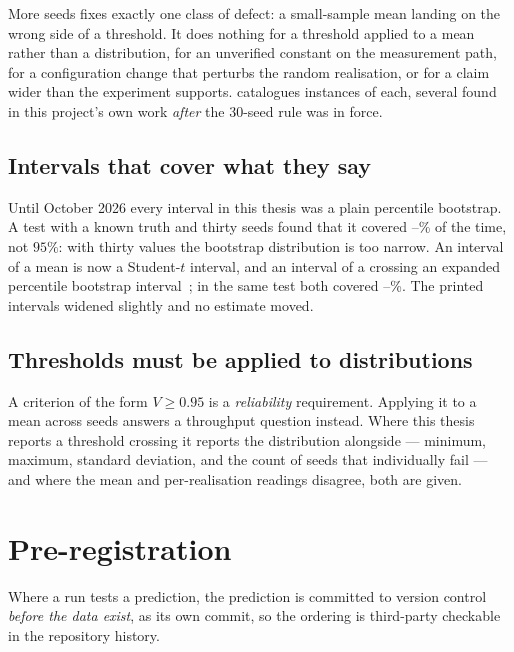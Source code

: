 \begin{remark}
More seeds fixes exactly one class of defect: a small-sample mean landing on the wrong side of a
threshold. It does nothing for a threshold applied to a mean rather than a distribution, for an
unverified constant on the measurement path, for a configuration change that perturbs the random
realisation, or for a claim wider than the experiment supports. 
catalogues instances of each, several found in this project's own work \emph{after} the 30-seed
rule was in force.
\end{remark}

\subsection{Intervals that cover what they say}\label{sec:coverage}

Until October 2026 every interval in this thesis was a plain percentile bootstrap. A test with a
known truth and thirty seeds found that it covered \covPlainLo--\covPlainHi\% of the time, not
$95\%$: with thirty values the bootstrap distribution is too narrow. An interval of a mean is now
a Student-$t$ interval, and an interval of a crossing an expanded percentile bootstrap
interval~\cite{hesterberg2015bootstrap}; in the same test both covered
\covFixedLo--\covFixedHi\%. The printed intervals widened slightly and no estimate moved.

\subsection{Thresholds must be applied to distributions}

A criterion of the form $V \geq 0.95$ is a \emph{reliability} requirement. Applying it to a mean
across seeds answers a throughput question instead. Where this thesis reports a threshold crossing
it reports the distribution alongside --- minimum, maximum, standard deviation, and the count of
seeds that individually fail --- and where the mean and per-realisation readings disagree, both are
given.

\section{Pre-registration}

Where a run tests a prediction, the prediction is committed to version control \emph{before the
data exist}, as its own commit, so the ordering is third-party checkable in the repository history.

